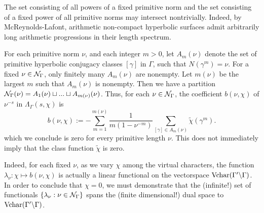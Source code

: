 \documentclass[11pt]{amsart}
\begin{document}
The set consisting of all powers of a fixed primitive norm and the set consisting of a fixed power of all primitive norms may intersect nontrivially. Indeed, by McReynolds-Lafont, arithmetic non-compact hyperbolic surfaces admit arbitrarily long arithmetic progressions in their length spectrum. 

For each primitive norm $\nu$, and each integer $m>0$, let $A_m(\nu)$ denote the set of primitive hyperbolic conjugacy classes $[\gamma]$ in $\Gamma$, such that $N(\gamma^m)=\nu$. For a fixed $\nu \in \mathcal{N}_\Gamma$, only finitely many $A_m(\nu)$ are nonempty. Let $m(\nu)$ be the largest $m$ such that $A_m(\nu)$ is nonempty.  Then we have a partition $\mathcal{N}_\Gamma(\nu)=A_1(\nu)\sqcup ...\sqcup A_{m(\nu)}(\nu)$. Thus, for each $\nu \in \mathcal{N}_\Gamma$, the  coefficient $b(\nu,\chi)$ of $\nu^{-s}$ in $\Lambda_\Gamma(s,\chi)$  is
	\[ b(\nu,\chi):= -\sum_{m=1}^{m(\nu)} \frac{1}{m(1-\nu^{-m})} \sum_{[\gamma]\in A_m(\nu)} \tilde{\chi}(\gamma^m). \]
which we conclude is zero for every primitive length $\nu$. This does not immediately imply that the class function $\tilde{\chi}$ is zero. 

Indeed, for each fixed $\nu$, as we vary $\chi$ among the virtual characters, the function  $\lambda_\nu: \chi \mapsto b(\nu,\chi)$ is actually a linear functional on the vectorspace $\operatorname{Vchar}(\Gamma' \backslash \Gamma)$. In order to conclude that $\chi=0$, we must demonstrate that the (infinite!) set of functionals $\{ \lambda_\nu: \nu \in \mathcal{N}_\Gamma\}$ spans the (finite dimensional!) dual space to $\operatorname{Vchar}(\Gamma'\backslash \Gamma)$. 
\end{document}
